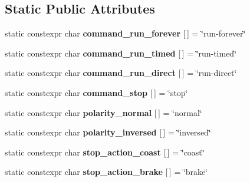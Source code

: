 \subsection*{Static Public Attributes}
\begin{DoxyCompactItemize}
\item 
\mbox{\label{classev3dev_1_1dc__motor_a17ffdfeb3eddb28fdd7b9596f294a92e}} 
static constexpr char {\bfseries command\+\_\+run\+\_\+forever} \mbox{[}$\,$\mbox{]} = \char`\"{}run-\/forever\char`\"{}
\item 
\mbox{\label{classev3dev_1_1dc__motor_a9bdb41abf7703bff44bba99c29ee4992}} 
static constexpr char {\bfseries command\+\_\+run\+\_\+timed} \mbox{[}$\,$\mbox{]} = \char`\"{}run-\/timed\char`\"{}
\item 
\mbox{\label{classev3dev_1_1dc__motor_a3229a32f1a132b56a67ee073b0d45b46}} 
static constexpr char {\bfseries command\+\_\+run\+\_\+direct} \mbox{[}$\,$\mbox{]} = \char`\"{}run-\/direct\char`\"{}
\item 
\mbox{\label{classev3dev_1_1dc__motor_a03afde68676d807809cb3bb3dd49c4ed}} 
static constexpr char {\bfseries command\+\_\+stop} \mbox{[}$\,$\mbox{]} = \char`\"{}stop\char`\"{}
\item 
\mbox{\label{classev3dev_1_1dc__motor_adbd994e482534f9b9f766bebaaa3dc16}} 
static constexpr char {\bfseries polarity\+\_\+normal} \mbox{[}$\,$\mbox{]} = \char`\"{}normal\char`\"{}
\item 
\mbox{\label{classev3dev_1_1dc__motor_a4dc1d491cf9cd0297d7b0c188725ec5c}} 
static constexpr char {\bfseries polarity\+\_\+inversed} \mbox{[}$\,$\mbox{]} = \char`\"{}inversed\char`\"{}
\item 
\mbox{\label{classev3dev_1_1dc__motor_a47d21e86f4b1952ef5d102da9338523a}} 
static constexpr char {\bfseries stop\+\_\+action\+\_\+coast} \mbox{[}$\,$\mbox{]} = \char`\"{}coast\char`\"{}
\item 
\mbox{\label{classev3dev_1_1dc__motor_a6f366be29d7776d8fbaeb88ace5ae13d}} 
static constexpr char {\bfseries stop\+\_\+action\+\_\+brake} \mbox{[}$\,$\mbox{]} = \char`\"{}brake\char`\"{}
\end{DoxyCompactItemize}
